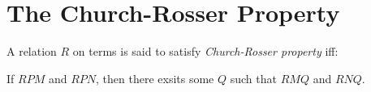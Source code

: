 \documentclass[../../../include/open-logic-section]{subfiles}
\begin{document}
\chapter{The Church-Rosser Property}

\begin{defn}
  A relation $R$ on terms is said to satisfy \emph{Church-Rosser
    property} iff:
  \begin{center}
    If $R P M$ and $R P N$, then there exsits some $Q$ such that $R M
    Q$ and $R N Q$.
  \end{center}
\end{defn}


\OLEndChapterHook
\end{document}

